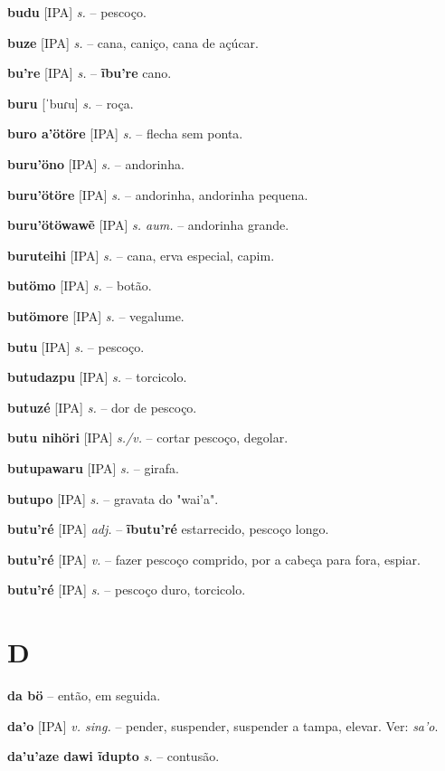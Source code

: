 \textbf{budu} [IPA] \textit{s.} -- pescoço.

\textbf{buze} [IPA] \textit{s.} -- cana, caniço, cana de açúcar.

\textbf{bu're} [IPA] \textit{s.} -- \textbf{ĩbu're} cano.

\textbf{buru} [ˈbuɾu] \textit{s.} -- roça.

\textbf{buro a'ötöre} [IPA] \textit{s.} -- flecha sem ponta.

\textbf{buru'öno} [IPA] \textit{s.} -- andorinha.

\textbf{buru'ötöre} [IPA] \textit{s.} -- andorinha, andorinha pequena.

\textbf{buru'ötöwawẽ} [IPA] \textit{s. aum.} -- andorinha grande.

\textbf{buruteihi} [IPA] \textit{s.} -- cana, erva especial, capim.

\textbf{butömo} [IPA] \textit{s.} -- botão.

\textbf{butömore} [IPA] \textit{s.} -- vegalume.

\textbf{butu} [IPA] \textit{s.} -- pescoço.

\textbf{butudazpu} [IPA] \textit{s.} -- torcicolo.

\textbf{butuzé} [IPA] \textit{s.} -- dor de pescoço.

\textbf{butu nihöri} [IPA] \textit{s./v.} -- cortar pescoço, degolar.

\textbf{butupawaru} [IPA] \textit{s.} -- girafa.

\textbf{butupo} [IPA] \textit{s.} -- gravata do "wai'a".

\textbf{butu'ré} [IPA] \textit{adj.} -- \textbf{ĩbutu'ré} estarrecido, pescoço longo.

\textbf{butu'ré} [IPA] \textit{v.} -- fazer pescoço comprido, por a cabeça para fora, espiar.

\textbf{butu'ré} [IPA] \textit{s.} -- pescoço duro, torcicolo.


\section*{D}


\textbf{da bö} -- então, em seguida.

\textbf{da'o} [IPA] \textit{v. sing.} -- pender, suspender, suspender a tampa, elevar. Ver: \textit{sa'o}.

\textbf{da'u'aze dawi ĩdupto} \textit{s.} -- contusão.

